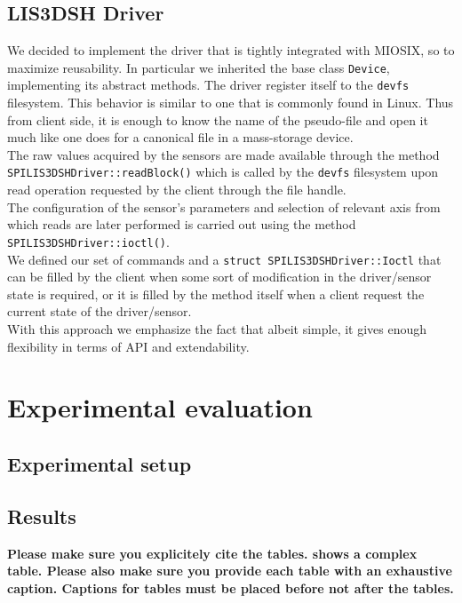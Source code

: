 \subsection{LIS3DSH Driver}
We decided to implement the driver that is tightly integrated with MIOSIX, so to maximize reusability. In particular we inherited the base class \texttt{Device}, implementing its abstract methods. The driver register itself to the \texttt{devfs} filesystem. This behavior is similar to one that is commonly found in Linux. Thus from client side, it is enough to know the name of the pseudo-file and open it much like one does for a canonical file in a mass-storage device.  \\ The raw values acquired by the sensors are made available through the method \\ \texttt{SPILIS3DSHDriver::readBlock()} which is called by the \texttt{devfs} filesystem upon read operation requested by the client through the file handle. \\
The configuration of the sensor's parameters and selection of relevant axis from which reads are later performed is carried out using the method \texttt{SPILIS3DSHDriver::ioctl()}. \\ We defined our set of commands and a \texttt{struct SPILIS3DSHDriver::Ioctl} that can be filled by the client when some sort of modification in the driver/sensor state is required, or it is filled by the method itself when a client request the current state of the driver/sensor. \\ With this approach we emphasize the fact that albeit simple, it gives enough flexibility in terms of API and extendability.

\section{Experimental evaluation}
\lipsum[1]
\subsection{Experimental setup}
\lipsum[1-2]
\subsection{Results}

\textbf{Please make sure you explicitely cite the tables.
 shows a complex table.
Please also make sure you provide each table with an exhaustive caption.
Captions for tables must be placed before not after the tables.}
\lipsum[1-4]


